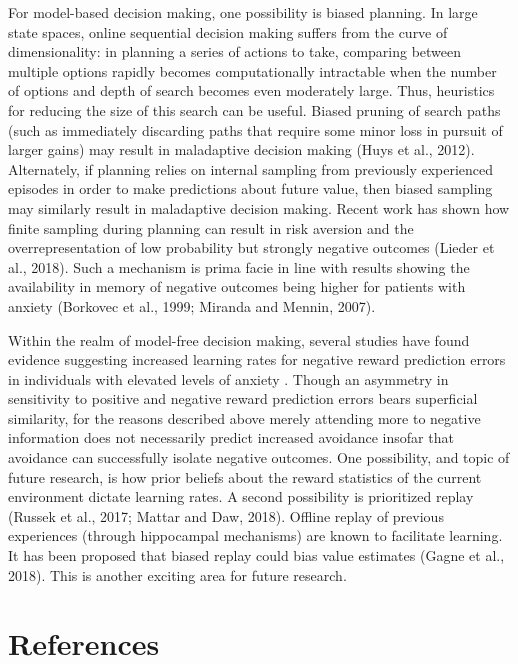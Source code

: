 \documentclass[11pt]{article} %
\begin{document}
For model-based decision making, one possibility is biased planning. In large
state spaces, online sequential decision making suffers from the curve of
dimensionality: in planning a series of actions to take, comparing between
multiple options rapidly becomes computationally intractable when the number of
options and depth of search becomes even moderately large. Thus, heuristics for
reducing the size of this search can be useful. Biased pruning of search paths
(such as immediately discarding paths that require some minor loss in pursuit of
larger gains) may result in maladaptive decision making (Huys et al., 2012).
Alternately, if planning relies on internal sampling from previously experienced
episodes in order to make predictions about future value, then biased sampling
 may similarly result in maladaptive decision making. Recent work has shown how
 finite sampling during planning can result in risk aversion and the overrepresentation
 of low probability but strongly negative outcomes (Lieder et al., 2018). Such a
 mechanism is prima facie in line with results showing the availability in memory
 of negative outcomes being higher for patients with anxiety (Borkovec et al., 1999;
 Miranda and Mennin, 2007).

Within the realm of model-free decision making, several studies have found evidence
suggesting increased learning rates for negative reward prediction errors in
individuals with elevated levels of anxiety \cite{Aylward, Huang2017, Harle2017
garrett2018}. Though an asymmetry in sensitivity to
positive and negative reward prediction errors bears superficial similarity, for
the reasons described above merely attending more to negative information does not
necessarily predict increased avoidance insofar that avoidance can successfully
isolate negative outcomes. One possibility, and topic of future research, is how
prior beliefs about the reward statistics of the current environment dictate
learning rates. A second possibility is prioritized replay (Russek et al., 2017;
Mattar and Daw, 2018). Offline replay of previous experiences (through hippocampal
mechanisms) are known to facilitate learning. It has been proposed that biased
replay could bias value estimates (Gagne et al., 2018). This is another exciting
area for future research.


\section{References}



\end{document}
